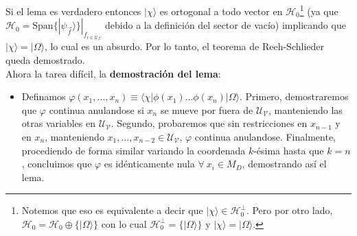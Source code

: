 Si el lema es verdadero entonces $|\chi\rangle$ es ortogonal a todo vector en $\mathcal{H}_0$\footnote{Notemos que eso es equivalente a decir que $|\chi\rangle \in \mathcal{H}^{\perp}_0$. Pero por otro lado, $\mathcal{H}_0=\mathcal{H}_0\oplus \{|\Omega\rangle \}$ con lo cual $\mathcal{H}^{\perp}_0=\{|\Omega\rangle\}$ y $|\chi\rangle =|\Omega\rangle$.} (ya que $\mathcal{H}_0=\text{Span}\{|\psi_{\vec{f}}\rangle\}|_{f_{i\in \mathcal{U}_{\Sigma}}}$ debido a la definición del sector de vacío) implicando que $|\chi\rangle=|\Omega\rangle$, lo cual es un absurdo. Por lo tanto, el teorema de Reeh-Schlieder queda demostrado.\\
Ahora la tarea difícil, la \textbf{demostración del lema}:
\begin{itemize}
\item Definamos $\varphi(x_1,\ldots,x_n)\equiv\langle\chi|\phi(x_1)\ldots \phi(x_n)|\Omega\rangle$. Primero, demostraremos que $\varphi$ continua anulandose si $x_n$ se mueve por fuera de $\mathcal{U}_{\mathcal{V}}$, manteniendo las otras variables en $\mathcal{U}_{\mathcal{V}}$. Segundo, probaremos que sin restricciones en $x_{n-1}$ y en $x_n$, manteniendo $x_1,\ldots,x_{n-2}\in \mathcal{U}_{\mathcal{V}}$, $\varphi$ continua anulandose. Finalmente, procediendo de forma similar variando la coordenada $k$-ésima hasta que $k=n$, concluimos que $\varphi$ es idénticamente nula $\forall\:x_i\in M_D$, demostrando así el lema.  


\end{itemize}
